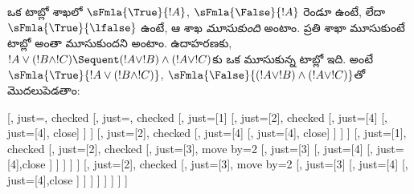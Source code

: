 \documentclass[../../../include/open-logic-section]{subfiles}
\begin{document}
ఒక టాబ్లో శాఖలో $\sFmla{\True}{!A}$, $\sFmla{\False}{!A}$ రెండూ ఉంటే, లేదా $\sFmla{\True}{\lfalse}$ ఉంటే, ఆ శాఖ \emph{మూసుకుంది} అంటాం. ప్రతి శాఖా మూసుకుంటే టాబ్లో అంతా మూసుకుందని అంటాం. ఉదాహరణకు, $!A \lor (!B \land !C) \Sequent (!A \lor !B) \land
(!A \lor !C)$కు ఒక మూసుకున్న టాబ్లో ఇది. అంటే $\sFmla{\True}{!A \lor (!B \land
!C)}$, $\sFmla{\False}{(!A \lor !B) \land (!A \lor !C)}$తో మొదలుపెడతాం:
\begin{maxwidth}
  \begin{tableau}{}
  [,
    just=\TAss, checked
    [, just=\TAss, checked
      [, just={\TRule{\True}{\lor}[1]}
        [,
          just={\TRule{\False}{\land}[2]}, checked
          [,
            just={\TRule{\False}{\lor}[4]}
            [,
              just={\TRule{\False}{\lor}[4]}, close]
          ]
        ]
        [,
          just={\TRule{\False}{\land}[2]}, checked
          [,
            just={\TRule{\False}{\lor}[4]}
            [,
              just={\TRule{\False}{\lor}[4]}, close]
          ]
        ]
      ]
      [,
        just={\TRule{\True}{\lor}[1]}, checked
        [,
          just={\TRule{\False}{\land}[2]}, checked
          [,
            just={\TRule{\True}{\land}[3]}, move by=2
            [,
              just={\TRule{\True}{\land}[3]}
              [,
                just={\TRule{\False}{\lor}[4]}
                [,
                  just={\TRule{\False}{\lor}[4]},close
                ]
              ]
            ]
          ]
        ]
        [,
          just={\TRule{\False}{\land}[2]}, checked
          [,
            just={\TRule{\True}{\land}[3]}, move by=2
              [,
                just={\TRule{\True}{\land}[3]}
                [,
                  just={\TRule{\False}{\lor}[4]}
                  [,
                  just={\TRule{\False}{\lor}[4]},close
                ]
              ]
            ]
          ]
        ]
      ]
    ]
  ]
\end{tableau}
\end{maxwidth}
\end{document}
